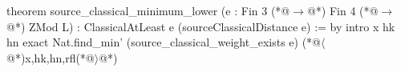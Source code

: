 theorem source_classical_minimum_lower (e : Fin 3 (*@$\to$@*) Fin 4 (*@$\to$@*) ZMod L) :
    ClassicalAtLeast e (sourceClassicalDistance e) := by
  intro x hk hn
  exact Nat.find_min' (source_classical_weight_exists e) (*@$\langle$@*)x,hk,hn,rfl(*@$\rangle$@*)
